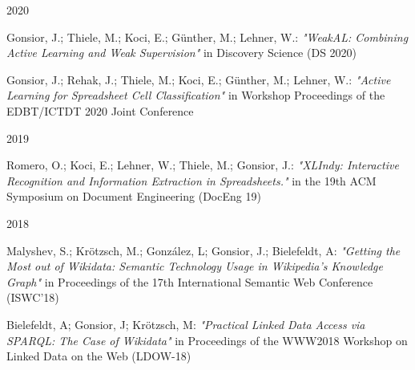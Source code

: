 \begin{cventries}

	\cventry
	{} %
	{} %
	{} %
	{2020} %
	{
		\begin{cvitems} %
			\item {Gonsior, J.; Thiele, M.; Koci, E.; Günther, M.; Lehner, W.: \emph{"WeakAL: Combining Active Learning and Weak Supervision"} in Discovery Science (DS 2020)}
			\item {Gonsior, J.; Rehak, J.; Thiele, M.; Koci, E.; Günther, M.; Lehner, W.: \emph{"Active Learning for Spreadsheet Cell Classification"} in Workshop Proceedings of the EDBT/ICTDT 2020 Joint Conference}
		\end{cvitems}
	}


	\cventry
	{} %
	{} %
	{} %
	{2019} %
	{
		\begin{cvitems} %
			\item {Romero, O.; Koci, E.; Lehner, W.; Thiele, M.; Gonsior, J.: \emph{"XLIndy: Interactive Recognition and Information Extraction in Spreadsheets."} in the 19th ACM Symposium on Document Engineering (DocEng 19)}
		\end{cvitems}
	}


	\cventry
	{} %
	{} %
	{} %
	{2018} %
	{
		\begin{cvitems} %
			\item {Malyshev, S.; Krötzsch, M.; González, L; Gonsior, J.; Bielefeldt, A: \emph{"Getting the Most out of Wikidata: Semantic Technology Usage in Wikipedia’s Knowledge Graph"} in Proceedings of the 17th International Semantic Web Conference (ISWC'18)}
			\item {Bielefeldt, A; Gonsior, J; Krötzsch, M: \emph{"Practical Linked Data Access via SPARQL: The Case of Wikidata"} in Proceedings of the WWW2018 Workshop on Linked Data on the Web (LDOW-18)}
		\end{cvitems}
	}

\end{cventries}